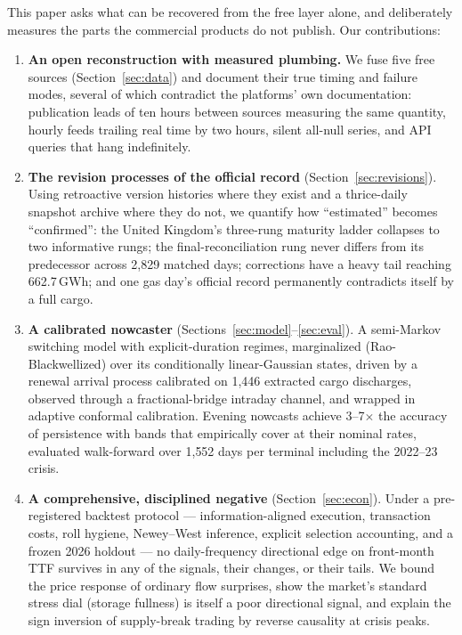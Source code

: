 \documentclass[11pt]{article}
\begin{document}
This paper asks what can be recovered from the free layer alone, and
deliberately measures the parts the commercial products do not publish.
Our contributions:

\begin{enumerate}
\item \textbf{An open reconstruction with measured plumbing.} We fuse five
free sources (Section~\ref{sec:data}) and document their true timing and
failure modes, several of which contradict the platforms' own
documentation: publication leads of ten hours between sources measuring
the same quantity, hourly feeds trailing real time by two hours, silent
all-null series, and API queries that hang indefinitely.
\item \textbf{The revision processes of the official record}
(Section~\ref{sec:revisions}). Using retroactive version histories where
they exist and a thrice-daily snapshot archive where they do not, we
quantify how ``estimated'' becomes ``confirmed'': the United Kingdom's
three-rung maturity ladder collapses to two informative rungs; the
final-reconciliation rung never differs from its predecessor across 2{,}829
matched days; corrections have a heavy tail reaching 662.7\,GWh; and one
gas day's official record permanently contradicts itself by a full cargo.
\item \textbf{A calibrated nowcaster} (Sections~\ref{sec:model}--\ref{sec:eval}).
A semi-Markov switching model with explicit-duration regimes, marginalized
(Rao-Blackwellized) over its conditionally linear-Gaussian states, driven
by a renewal arrival process calibrated on 1{,}446 extracted cargo
discharges, observed through a fractional-bridge intraday channel, and
wrapped in adaptive conformal calibration. Evening nowcasts achieve
3--7$\times$ the accuracy of persistence with bands that empirically cover
at their nominal rates, evaluated walk-forward over 1{,}552 days per
terminal including the 2022--23 crisis.
\item \textbf{A comprehensive, disciplined negative}
(Section~\ref{sec:econ}). Under a pre-registered backtest protocol ---
information-aligned execution, transaction costs, roll hygiene,
Newey--West inference, explicit selection accounting, and a frozen 2026
holdout --- no daily-frequency directional edge on front-month TTF
survives in any of the signals, their changes, or their tails. We bound
the price response of ordinary flow surprises, show the market's standard
stress dial (storage fullness) is itself a poor directional signal, and
explain the sign inversion of supply-break trading by reverse causality at
crisis peaks.
\end{enumerate}
\end{document}
